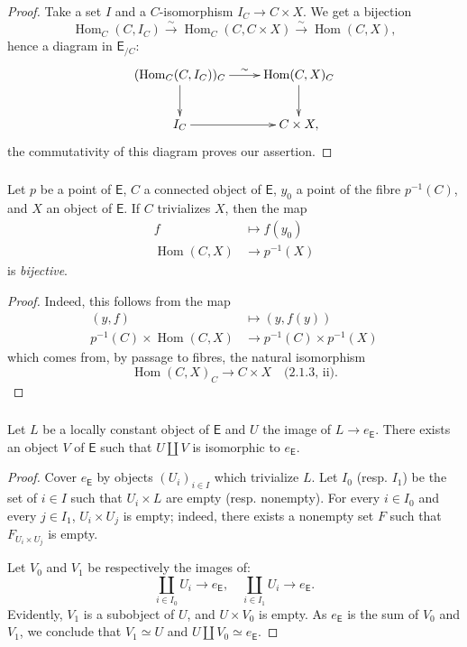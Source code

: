 \documentclass[10pt,oneside]{amsart}
\newcommand{\oldpage}[1]{\marginnote{\textbf{#1}}}
\newcommand{\cat}{\mathsf}
\DeclareMathOperator{\Hom}{Hom}
\begin{document}
\begin{proof}
Take a set $I$ and a $C$-isomorphism $I_C\to C\times X$.
We get a bijection
\[
  \Hom_C(C,I_C)\xrightarrow{~\sim~}\Hom_C(C,C\times X)\xrightarrow{~\sim~}\Hom(C,X),
\]
hence a diagram in $\cat{E}_{/C}$:
\[
  \xymatrix{
    (\Hom_C(C,I_C))_C\ar[r]^-\sim\ar[d] & \Hom(C,X)_C\ar[d]\\
    I_C\ar[r] & C\times X,
  }
\]
the commutativity of this diagram proves our assertion.
\end{proof}

\subsubsection{}
\oldpage{7}
Let $p$ be a point of $\cat{E}$, $C$ a connected object of $\cat{E}$, $y_0$ a point of the fibre $p^{-1}(C)$, and $X$ an object of $\cat{E}$.
If $C$ trivializes $X$, then the map
\begin{align*}
  f & \longmapsto f(y_0)\\
  \Hom(C,X) & \longrightarrow p^{-1}(X)
\end{align*}
is \emph{bijective}.

\begin{proof}
Indeed, this follows from the map
\begin{align*}
  (y,f) & \longmapsto (y,f(y))\\
  p^{-1}(C)\times\Hom(C,X) & \longrightarrow p^{-1}(C)\times p^{-1}(X)
\end{align*}
which comes from, by passage to fibres, the natural isomorphism
\[
  \Hom(C,X)_C\longrightarrow C\times X\quad\text{(2.1.3, ii)}.
\]
\end{proof}

\subsubsection{}
Let $L$ be a locally constant object of $\cat{E}$ and $U$ the image of $L\to e_\cat{E}$.
There exists an object $V$ of $\cat{E}$ such that $U\amalg V$ is isomorphic to $e_\cat{E}$.

\begin{proof}
Cover $e_\cat{E}$ by objects $(U_i)_{i\in I}$ which trivialize $L$.
Let $I_0$ (resp. $I_1$) be the set of $i\in I$ such that $U_i\times L$ are empty (resp. nonempty).
For every $i\in I_0$ and every $j\in I_1$, $U_i\times U_j$ is empty;
indeed, there exists a nonempty set $F$ such that $F_{U_i\times U_j}$ is empty.

Let $V_0$ and $V_1$ be respectively the images of:
\[
  \coprod_{i\in I_0}U_i\longrightarrow e_\cat{E},\quad\coprod_{i\in I_1}U_i\longrightarrow e_\cat{E}.
\]
Evidently, $V_1$ is a subobject of $U$, and $U\times V_0$ is empty.
As $e_\cat{E}$ is the sum of $V_0$ and $V_1$, we conclude that $V_1\simeq U$ and $U\amalg V_0\simeq e_\cat{E}$.
\end{proof}
\end{document}
